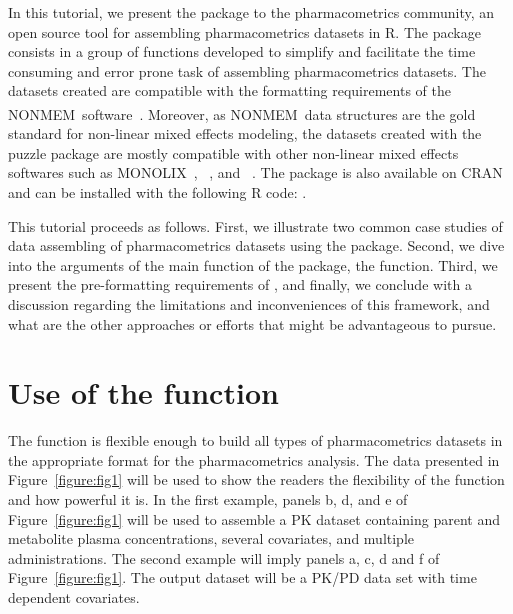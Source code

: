 In this tutorial, we present the  package to the pharmacometrics community, an open source tool for assembling pharmacometrics datasets in R. The  package consists in a group of functions developed to simplify and facilitate the time consuming and error prone task of assembling pharmacometrics datasets. The datasets created are compatible with the formatting requirements of the NONMEM\textsuperscript{\textregistered}~software~\citep{Beal2009}. Moreover, as NONMEM\textsuperscript{\textregistered}~data structures are the gold standard for non-linear mixed effects modeling, the datasets created with the puzzle package are mostly compatible with other non-linear mixed effects softwares such as MONOLIX~\citep{Lixoft}, ~\citep{Comets2011},  and ~\citep{Fidler2019}.  The  package is also available on CRAN and can be installed with the following R code: .

This tutorial proceeds as follows. First, we illustrate two common case studies of data assembling of pharmacometrics datasets using the  package. Second, we dive into the arguments of the main function of the  package, the  function. Third, we present the pre-formatting requirements of , and finally, we conclude with a discussion regarding the limitations and inconveniences of this framework, and what are the other approaches or efforts that might be advantageous to pursue.

\section{Use of the  function}

The   function is flexible enough to build all types of pharmacometrics datasets in the appropriate format for the pharmacometrics analysis. The data presented in Figure~\ref{figure:fig1} will be used to show the readers the flexibility of the   function and how powerful it is. In the first example, panels b, d, and e of Figure~\ref{figure:fig1} will be used to assemble a PK dataset containing parent and metabolite plasma concentrations, several covariates, and multiple administrations. The second example will imply panels a, c, d and f of Figure~\ref{figure:fig1}. The output dataset will be a PK/PD data set with time dependent covariates.

